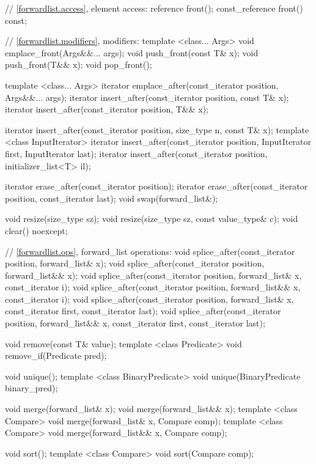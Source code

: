 \begin{codeblock}
{{    // \ref{forwardlist.access}, element access:
    reference front();
    const_reference front() const;

    // \ref{forwardlist.modifiers}, modifiers:
    template <class... Args> void emplace_front(Args&&... args);
    void push_front(const T& x);
    void push_front(T&& x);
    void pop_front();

    template <class... Args> iterator emplace_after(const_iterator position, Args&&... args);
    iterator insert_after(const_iterator position, const T& x);
    iterator insert_after(const_iterator position, T&& x);

    iterator insert_after(const_iterator position, size_type n, const T& x);
    template <class InputIterator>
      iterator insert_after(const_iterator position, InputIterator first, InputIterator last);
    iterator insert_after(const_iterator position, initializer_list<T> il);

    iterator erase_after(const_iterator position);
    iterator erase_after(const_iterator position, const_iterator last);
    void swap(forward_list&);

    void resize(size_type sz);
    void resize(size_type sz, const value_type& c);
    void clear() noexcept;

    // \ref{forwardlist.ops}, forward_list operations:
    void splice_after(const_iterator position, forward_list& x);
    void splice_after(const_iterator position, forward_list&& x);
    void splice_after(const_iterator position, forward_list& x,
                      const_iterator i);
    void splice_after(const_iterator position, forward_list&& x,
                      const_iterator i);
    void splice_after(const_iterator position, forward_list& x,
                      const_iterator first, const_iterator last);
    void splice_after(const_iterator position, forward_list&& x,
                      const_iterator first, const_iterator last);

    void remove(const T& value);
    template <class Predicate> void remove_if(Predicate pred);

    void unique();
    template <class BinaryPredicate> void unique(BinaryPredicate binary_pred);

    void merge(forward_list& x);
    void merge(forward_list&& x);
    template <class Compare> void merge(forward_list& x, Compare comp);
    template <class Compare> void merge(forward_list&& x, Compare comp);

    void sort();
    template <class Compare> void sort(Compare comp);

}}
\end{codeblock}
